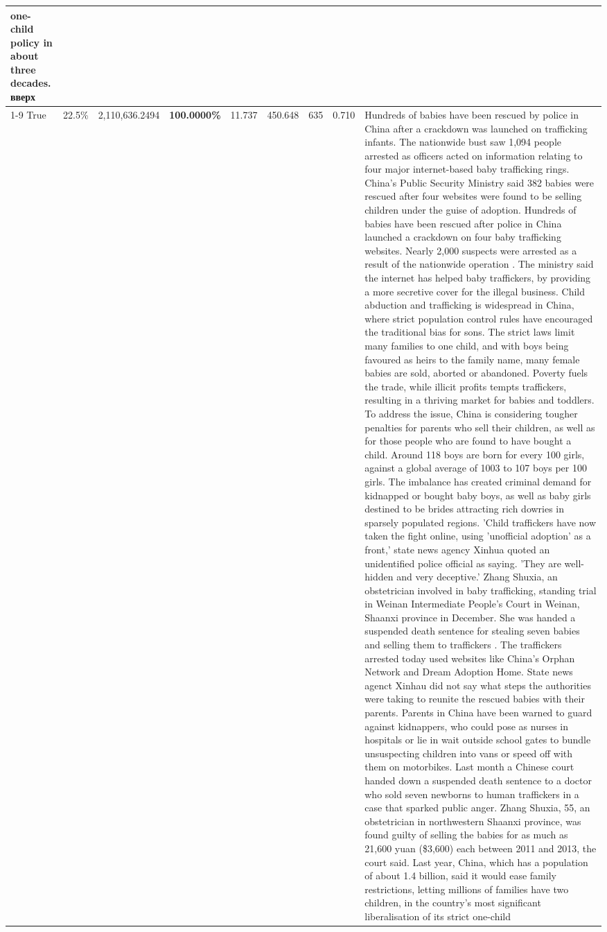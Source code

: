 \begin{table}[H]
\begin{tabular}{lllrlllll}
one-child policy in about three decades. вверх \\
\cline{1-9}
True & 22.5\% & 2,110,636.2494 & \bfseries \color{red} 100.0000\% & 11.737 & 450.648 & 635 & 0.710 & Hundreds of babies have been rescued by police in China after a crackdown was launched on trafficking infants. The nationwide bust saw 1,094 people arrested as officers acted on information relating to four major internet-based baby trafficking rings. China's Public Security Ministry said 382 babies were rescued after four websites were found to be selling children under the guise of adoption. Hundreds of babies have been rescued after police in China launched a crackdown on four baby trafficking websites. Nearly 2,000 suspects were arrested as a result of the nationwide operation . The ministry said the internet has helped baby traffickers, by providing a more secretive cover for the illegal business. Child abduction and trafficking is widespread in China, where strict population control rules have encouraged the traditional bias for sons. The strict laws limit many families to one child, and with boys being favoured as heirs to the family name, many female babies are sold, aborted or abandoned. Poverty fuels the trade, while illicit profits tempts traffickers, resulting in a thriving market for babies and toddlers. To address the issue, China is considering tougher penalties for parents who sell their children, as well as for those people who are found to have bought a child. Around 118 boys are born for every 100 girls, against a global average of 1003 to 107 boys per 100 girls. The imbalance has created criminal demand for kidnapped or bought baby boys, as well as baby girls destined to be brides attracting rich dowries in sparsely populated regions. 'Child traffickers have now taken the fight online, using 'unofficial adoption' as a front,' state news agency Xinhua quoted an unidentified police official as saying. 'They are well-hidden and very deceptive.' Zhang Shuxia, an obstetrician involved in baby trafficking, standing trial in Weinan Intermediate People's Court in Weinan, Shaanxi province in December. She was handed a suspended death sentence for stealing seven babies and selling them to traffickers . The traffickers arrested today used websites like China's Orphan Network and Dream Adoption Home. State news agenct Xinhau did not say what steps the authorities were taking to reunite the rescued babies with their parents. Parents in China have been warned to guard against kidnappers, who could pose as nurses in hospitals or lie in wait outside school gates to bundle unsuspecting children into vans or speed off with them on motorbikes. Last month a Chinese court handed down a suspended death sentence to a doctor who sold seven newborns to human traffickers in a case that sparked public anger. Zhang Shuxia, 55, an obstetrician in northwestern Shaanxi province, was found guilty of selling the babies for as much as 21,600 yuan (\$3,600) each between 2011 and 2013, the court said. Last year, China, which has a population of about 1.4 billion, said it would ease family restrictions, letting millions of families have two children, in the country's most significant liberalisation of its strict one-child 
\end{tabular}
\end{table}
